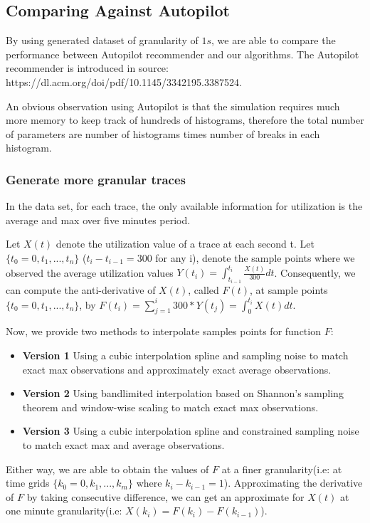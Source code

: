 \documentclass{article}
\begin{document}
\subsection{Comparing Against Autopilot}

\begin{flushleft}
By using generated dataset of granularity of $1s$, we are able to compare the performance between Autopilot recommender and our algorithms. The Autopilot recommender is introduced in source: https://dl.acm.org/doi/pdf/10.1145/3342195.3387524.

An obvious observation using Autopilot is that the simulation requires much more memory to keep track of hundreds of histograms, therefore the total number of parameters are number of histograms times number of breaks in each histogram.
\end{flushleft}

\subsubsection{Generate more granular traces}

\begin{flushleft}
In the data set, for each trace, the only available information for utilization is the average and max over five minutes period. 

Let $X(t)$ denote the utilization value of a trace at each second t. Let $\{t_0 = 0,t_1,...,t_n\}$ ($t_i - t_{i-1} = 300$ for any i), denote the sample points where we observed the average utilization values $Y(t_i) = \int_{t_{i-1}}^{t_i}\frac{X(t)}{300}dt$. Consequently, we can compute the anti-derivative of $X(t)$, called $F(t)$, at sample points $\{t_0 = 0,t_1,...,t_n\}$, by $F(t_i) = \sum_{j=1}^{i} 300 * Y(t_j) = \int_{0}^{t_i}X(t)dt$. 

Now, we provide two methods to interpolate samples points for function $F$:
\begin{itemize}
    \item \textbf{Version 1} Using a cubic interpolation spline and sampling noise to match exact max observations and approximately exact average observations.
    \item \textbf{Version 2} Using bandlimited interpolation based on Shannon's sampling theorem and window-wise scaling to match exact max observations.
    \item \textbf{Version 3} Using a cubic interpolation spline and constrained sampling noise to match exact max and average observations.
\end{itemize}

Either way, we are able to obtain the values of $F$ at a finer granularity(i.e: at time grids $\{k_0 = 0, k_1, ..., k_m\}$ where $k_i - k_{i-1} = 1$). Approximating the derivative of $F$ by taking consecutive difference, we can get an approximate for $X(t)$ at one minute granularity(i.e: $X(k_i) = F(k_i) - F(k_{i-1})$).    
\end{flushleft}
\end{document}

